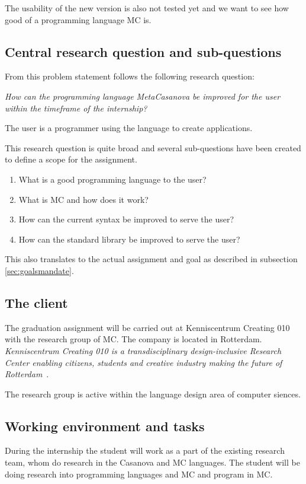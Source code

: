 The usability of the new version is also not tested yet and we want to see how good of a programming language MC is.

\subsection{Central research question and sub-questions}
From this problem statement follows the following research question:

\emph{How can the programming language MetaCasanova be improved for the user within the timeframe of the internship?}

The user is a programmer using the language to create applications.

This research question is quite broad and several sub-questions have been created to define a scope for the assignment.

\begin{enumerate}[noitemsep]
   \item What is a good programming language to the user?
   \item What is MC and how does it work?
   \item How can the current syntax be improved to serve the user?
   \item How can the standard library be improved to serve the user?
\end{enumerate}

This also translates to the actual assignment and goal as described in subsection \ref{sec:goalsmandate}.

\subsection{The client}\label{sec:clientmandate}
The graduation assignment will be carried out at Kenniscentrum Creating 010 with the research group of MC.
The company is located in Rotterdam.
\textit{Kenniscentrum Creating 010 is a transdisciplinary design-inclusive Research Center enabling citizens, students and creative industry making the future of Rotterdam}~\cite{creating2016home}.

The research group is active within the language design area of computer siences.


\subsection{Working environment and tasks}\label{sec:workenvmandate}
During the internship the student will work as a part of the existing research team, whom do research in the Casanova and MC languages.
The student will be doing research into programming languages and MC and program in MC.

